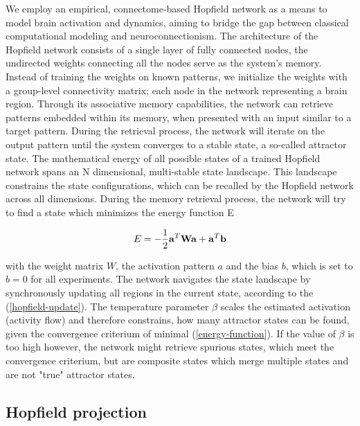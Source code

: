 \documentclass{article}
\begin{document}
We employ an empirical, connectome-based Hopfield network as a means to model brain activation and dynamics, aiming to
bridge the gap between classical computational modeling and neuroconnectionism. The architecture of the Hopfield network
consists of a single layer of fully connected nodes, the undirected weights connecting all the nodes serve as the
system's memory. Instead of training the weights on known patterns, we initialize the weights with a group-level
connectivity matrix; each node in the network representing a brain region. Through its associative memory capabilities,
the network can retrieve patterns embedded within its memory, when presented with an input similar to a target
pattern. During the retrieval process, the network will iterate on the output pattern until the system converges to a
stable state, a so-called attractor state. The mathematical energy of all possible states of a trained Hopfield network
spans an N dimensional, multi-stable state landscape. This landscape constrains the state configurations, which can be
recalled by the Hopfield network across all dimensions. During the memory retrieval process, the network will try to
find a state which minimizes the energy function E

\begin{equation}
\label{energy-function}
E = - \frac{1}{2}  \bold{a}^{T} \bold{W} \bold{a} + \bold{a}^{T}\bold{b}
\end{equation}

with the weight matrix $W$, the activation pattern $a$ and the bias $b$, which is set to $b = 0$ for all experiments.
The network navigates the state landscape by synchronously updating all regions in the current state, according to the
(\ref{hopfield-update}). The temperature parameter $\beta$ scales the estimated activation (activity flow)
and therefore constrains, how many attractor states can be found, given the convergence criterium of minimal
(\ref{energy-function}). If the value of $\beta$ is too high however, the network might retrieve spurious states,
which meet the convergence criterium, but are composite states which merge multiple states and are not "true"
attractor states.

\subsection{Hopfield projection}\label{Hopfield projection}
\end{document}
